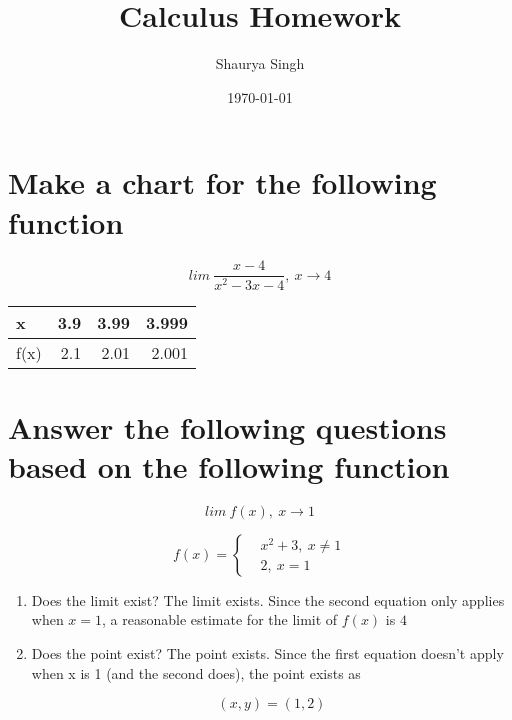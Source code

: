 \documentclass[11pt]{article}
\author{Shaurya Singh}
\date{\today}
\title{Calculus Homework}
\begin{document}
\maketitle

\section{Make a chart for the following function}
\label{sec:orgd9d0602}

\begin{equation}
lim\  \frac{x-4}{x^2-3x-4},\ x \rightarrow 4
\end{equation}

\begin{center}
\begin{tabular}{lrrr}
x & 3.9 & 3.99 & 3.999\\
\hline
f(x) & 2.1 & 2.01 & 2.001\\
\end{tabular}
\end{center}

\section{Answer the following questions based on the following function}
\label{sec:org76331a3}

\begin{equation}
lim\ f(x),\ x \rightarrow 1
\end{equation}

\begin{equation}
  f(x) =
    \begin{cases}
      &x^2+3,\ x\neq1\\
      &2,\ x=1
    \end{cases}
\end{equation}

\begin{enumerate}
\item Does the limit exist?
The limit exists. Since the second equation only applies when \(x = 1\), a reasonable estimate for the limit of \(f(x)\) is \(4\)
\item Does the point exist?
The point exists. Since the first equation doesn't apply when x is 1 (and the second does), the point exists as

\begin{equation}
(x,y) = (1,2)
\end{equation}
\end{enumerate}
\end{document}
